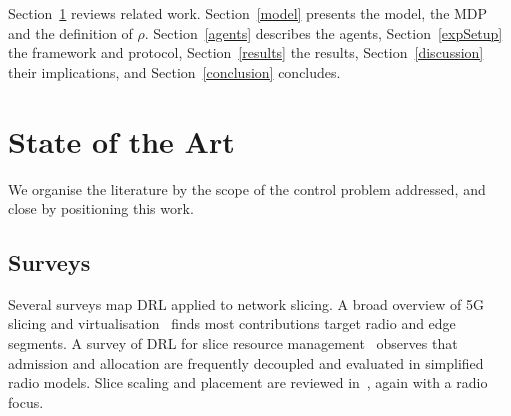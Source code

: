 \documentclass[10pt,journal,comsoc]{IEEEtran}
\begin{document}
Section~\ref{State_of_Art} reviews related work. Section~\ref{model}
presents the model, the MDP and the definition of $\rho$.
Section~\ref{agents} describes the agents, Section~\ref{expSetup} the
framework and protocol, Section~\ref{results} the results,
Section~\ref{discussion} their implications, and
Section~\ref{conclusion} concludes.

\section{State of the Art} \label{State_of_Art}
We organise the literature by the scope of the control problem addressed,
and close by positioning this work.

\subsection{Surveys}
Several surveys map DRL applied to network slicing. A broad overview of
5G slicing and virtualisation~\cite{ssengonzi2022survey} finds most
contributions target radio and edge segments. A survey of DRL for slice
resource management~\cite{hurtado2022deep} observes that admission and
allocation are frequently decoupled and evaluated in simplified radio
models. Slice scaling and placement are reviewed
in~\cite{saha2023deep}, again with a radio focus.
\end{document}
